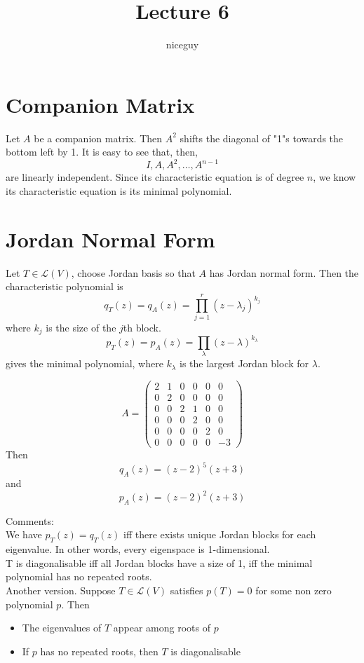 \documentclass[12pt]{article}
\author{niceguy}
\title{Lecture 6}
\begin{document}
\maketitle

\section{Companion Matrix}

Let $A$ be a companion matrix. Then $A^2$ shifts the diagonal of "1"s towards the bottom left by 1. It is easy to see that, then,
$$I,A,A^2,\dots,A^{n-1}$$
are linearly independent. Since its characteristic equation is of degree $n$, we know its characteristic equation is its minimal polynomial.

\section{Jordan Normal Form}

Let $T\in\mathcal L(V)$, choose Jordan basis so that $A$ has Jordan normal form. Then the characteristic polynomial is
$$q_T(z) = q_A(z) = \prod_{j=1}^r (z-\lambda_j)^{k_j}$$
where $k_j$ is the size of the $j$th block.
$$p_T(z) = p_A(z) = \prod_\lambda (z-\lambda)^{k_\lambda}$$
gives the minimal polynomial, where $k_\lambda$ is the largest Jordan block for $\lambda$.

\begin{ex}

	$$A = \begin{pmatrix} 2 & 1 & 0 & 0 & 0 & 0 \\ 0 & 2 & 0 & 0 & 0 & 0 \\ 0 & 0 & 2 & 1 & 0 & 0 \\ 0 & 0 & 0 & 2 & 0 & 0 \\ 0 & 0 & 0 & 0 & 2 & 0 \\ 0 & 0 & 0 & 0 & 0 & -3\end{pmatrix}$$
	Then
	$$q_A(z) = (z-2)^5(z+3)$$
	and
	$$p_A(z) = (z-2)^2(z+3)$$
\end{ex}

Comments: \\
We have $p_T(z)=q_T(z)$ iff there exists unique Jordan blocks for each eigenvalue. In other words, every eigenspace is 1-dimensional. \\
T is diagonalisable iff all Jordan blocks have a size of 1, iff the minimal polynomial has no repeated roots. \\
Another version. Suppose $T\in\mathcal L(V)$ satisfies $p(T)=0$ for some non zero polynomial $p$. Then
\begin{itemize}
	\item The eigenvalues of $T$ appear among roots of $p$
	\item If $p$ has no repeated roots, then $T$ is diagonalisable
\end{itemize}
\end{document}
